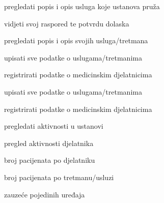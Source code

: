 			
			\begin{packed_enum}
				\item  {}
				
				\begin{packed_enum}
					
					\item pregledati popis i opis usluga koje ustanova pruža
										
				\end{packed_enum}
			
				\item  {}
				
				\begin{packed_enum}
					
					\item vidjeti svoj raspored te potvrdu dolaska
					\item pregledati popis i opis svojih usluga/tretmana
					
				\end{packed_enum}
			
				\item  {}
			
				\begin{packed_enum}
					
					\item upisati sve podatke o uslugama/tretmanima
					\item registrirati podatke o medicinskim djelatnicima
					
				\end{packed_enum}
			
				\item  {}
			
				\begin{packed_enum}
					
					\item upisati sve podatke o uslugama/tretmanima
					\item registrirati podatke o medicinskim djelatnicima
					\item pregledati aktivnosti u ustanovi
					\begin{packed_enum}
						
						\item pregled aktivnosti djelatnika
						\item broj pacijenata po djelatniku
						\item broj pacijenata po tretmanu/usluzi
						\item zauzeće pojedinih uređaja
						

\end{packed_enum}
\end{packed_enum}
\end{packed_enum}
